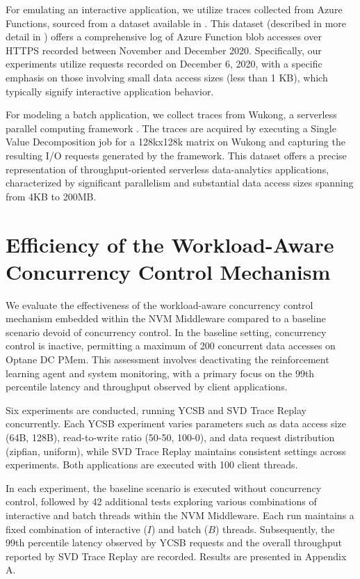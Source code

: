 For emulating an interactive application, we utilize traces collected from Azure Functions, sourced from a dataset available in \cite{GitHubAz35:online}. This dataset (described in more detail in \cite{romero2021faat}) offers a comprehensive log of Azure Function blob accesses over HTTPS recorded between November and December 2020. Specifically, our experiments utilize requests recorded on December 6, 2020, with a specific emphasis on those involving small data access sizes (less than 1 KB), which typically signify interactive application behavior.

For modeling a batch application, we collect traces from Wukong, a serverless parallel computing framework \cite{carver2020wukong}. The traces are acquired by executing a Single Value Decomposition job for a 128kx128k matrix on Wukong and capturing the resulting I/O requests generated by the framework. This dataset offers a precise representation of throughput-oriented serverless data-analytics applications, characterized by significant parallelism and substantial data access sizes spanning from 4KB to 200MB.


\section{Efficiency of the Workload-Aware Concurrency Control Mechanism}

We evaluate the effectiveness of the workload-aware concurrency control mechanism embedded within the NVM Middleware compared to a baseline scenario devoid of concurrency control. In the baseline setting, concurrency control is inactive, permitting a maximum of 200 concurrent data accesses on Optane DC PMem. This assessment involves deactivating the reinforcement learning agent and system monitoring, with a primary focus on the 99th percentile latency and throughput observed by client applications.

Six experiments are conducted, running YCSB and SVD Trace Replay concurrently. Each YCSB experiment varies parameters such as data access size (64B, 128B), read-to-write ratio (50-50, 100-0), and data request distribution (zipfian, uniform), while SVD Trace Replay maintains consistent settings across experiments. Both applications are executed with 100 client threads.

In each experiment, the baseline scenario is executed without concurrency control, followed by 42 additional tests exploring various combinations of interactive and batch threads within the NVM Middleware. Each run maintains a fixed combination of interactive ($I$) and batch ($B$) threads. Subsequently, the 99th percentile latency observed by YCSB requests and the overall throughput reported by SVD Trace Replay are recorded. Results are presented in Appendix A.

